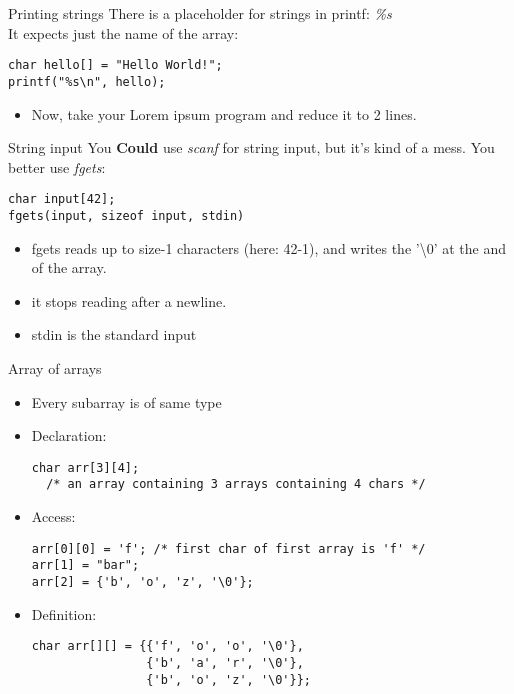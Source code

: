 \begin{frame}[fragile]{Printing strings}
	There is a placeholder for strings in printf: \textit{\%s}\\
	It expects just the name of the array:
	\begin{lstlisting}[numbers=none]
char hello[] = "Hello World!";
printf("%s\n", hello);
\end{lstlisting}
	\begin{itemize}
		\item Now, take your Lorem ipsum program and reduce it to 2 lines.
	\end{itemize}
\end{frame}
\begin{frame}[fragile]{String input}
	You \textbf{Could} use \textit{scanf} for string input, but it's kind of a mess. You better use \textit{fgets}:
	\begin{lstlisting}[numbers=none]
char input[42];
fgets(input, sizeof input, stdin)
\end{lstlisting}
	\begin{itemize}
		\item fgets reads up to size-1 characters (here: 42-1), and writes the '\textbackslash0' at the and of the array.
		\item it stops reading after a newline.
		\item stdin is the standard input
	\end{itemize}
\end{frame}
\begin{frame}[fragile]{Array of arrays}
	\begin{itemize}
		\item Every subarray is of same type
		\item Declaration:
		\begin{lstlisting}[numbers=none]
char arr[3][4];
  /* an array containing 3 arrays containing 4 chars */
\end{lstlisting}
		\item Access:
		\begin{lstlisting}[numbers=none]
arr[0][0] = 'f'; /* first char of first array is 'f' */
arr[1] = "bar";
arr[2] = {'b', 'o', 'z', '\0'};
\end{lstlisting}
		\item Definition:
		\begin{lstlisting}[numbers=none]
char arr[][] = {{'f', 'o', 'o', '\0'},
				{'b', 'a', 'r', '\0'},
				{'b', 'o', 'z', '\0'}};
\end{lstlisting}
	\end{itemize}
\end{frame}
